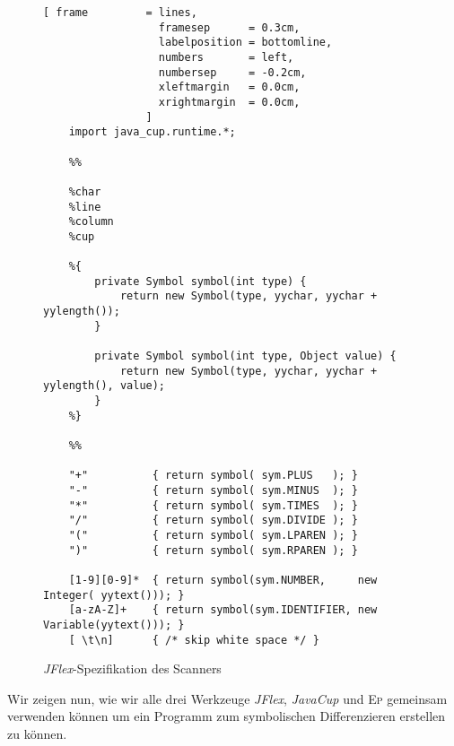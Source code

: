 \begin{figure}[!ht]
\centering
\begin{Verbatim}[ frame         = lines, 
                  framesep      = 0.3cm, 
                  labelposition = bottomline,
                  numbers       = left,
                  numbersep     = -0.2cm,
                  xleftmargin   = 0.0cm,
                  xrightmargin  = 0.0cm,
                ]
    import java_cup.runtime.*;
          
    %%
       
    %char
    %line
    %column
    %cup
       
    %{   
        private Symbol symbol(int type) {
            return new Symbol(type, yychar, yychar + yylength());
        }
        
        private Symbol symbol(int type, Object value) {
            return new Symbol(type, yychar, yychar + yylength(), value);
        }
    %}
       
    %%
       
    "+"          { return symbol( sym.PLUS   ); }
    "-"          { return symbol( sym.MINUS  ); }
    "*"          { return symbol( sym.TIMES  ); }
    "/"          { return symbol( sym.DIVIDE ); }
    "("          { return symbol( sym.LPAREN ); }
    ")"          { return symbol( sym.RPAREN ); }
    
    [1-9][0-9]*  { return symbol(sym.NUMBER,     new Integer( yytext())); }
    [a-zA-Z]+    { return symbol(sym.IDENTIFIER, new Variable(yytext())); }
    [ \t\n]      { /* skip white space */ }   
\end{Verbatim}
\vspace*{-0.3cm}
\caption{\textsl{JFlex}-Spezifikation des Scanners}
\label{fig:differentiator.jflex}
\end{figure}
\noindent
Wir zeigen nun, wie wir alle  drei Werkzeuge
\textsl{JFlex}, \textsl{JavaCup} und \textsc{Ep} gemeinsam verwenden k\"onnen um ein
Programm zum symbolischen Differenzieren erstellen zu k\"onnen.  
